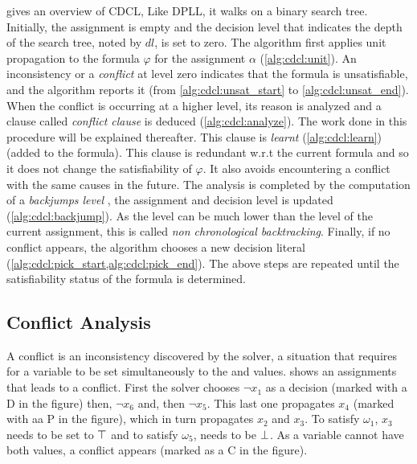 gives an overview of CDCL, Like DPLL,  it walks on a binary search tree.
Initially, the  assignment is empty and the decision level that 
indicates the depth of the search tree, noted by $dl$, is set to zero.
The algorithm first applies unit propagation to the formula $\varphi$ for the  assignment $\alpha$ (\cref{alg:cdcl:unit}).
An inconsistency or a \emph{conflict} at level zero indicates that the formula is unsatisfiable, and the algorithm
reports it (from \cref{alg:cdcl:unsat_start} to \cref{alg:cdcl:unsat_end}). When the conflict is occurring at a higher level, its reason is analyzed and a clause called \emph{conflict clause} is deduced (\cref{alg:cdcl:analyze}).
The work done in this procedure will be explained thereafter.
This clause is \emph{learnt} (\cref{alg:cdcl:learn}) (added to the formula). This clause is redundant w.r.t the current
formula and so it does not change the satisfiability of $\varphi$. It also avoids encountering a conflict with the same
causes in the future.
The analysis is completed by the computation of a \emph{backjumps level} , the assignment and decision level is updated (\cref{alg:cdcl:backjump}). As the level can be much lower than the level of the current assignment, this is called \emph{non chronological backtracking}.
Finally, if no conflict appears, the algorithm chooses a new decision literal 
(\cref{alg:cdcl:pick_start,alg:cdcl:pick_end}).
The above steps are repeated until the satisfiability status of the
formula is determined.



\subsection{Conflict Analysis}
A conflict is an inconsistency discovered by the solver, a situation that requires for a variable to be set 
simultaneously to the \true and \false values.  shows an assignments that leads to a conflict.
First the solver chooses $\neg x_1$ as a decision (marked with a D in the figure) then, $\neg x_6$ and, then $\neg x_5$. This last one propagates $x_4$ (marked with aa P in the figure),
which in turn propagates $x_2$ and $x_3$.
To satisfy $\omega_1$, $x_3$ needs to be set to $\top$ and  to satisfy $\omega_5$, 
needs to be $\bot$. As a variable cannot have both values, a conflict appears (marked as a C in the figure).

